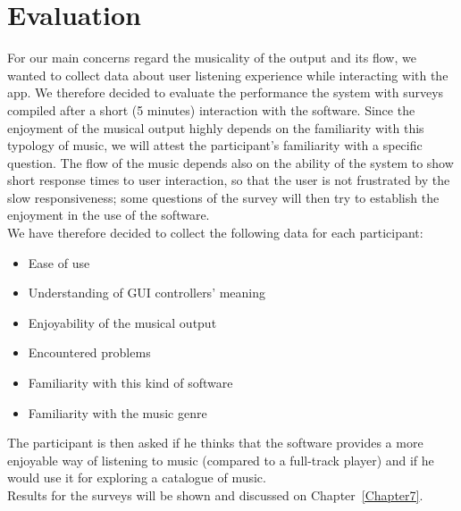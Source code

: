 \begin{figure}
\centering
{}
\end{figure}

\section{Evaluation}
\label{sec:evaluation_idea}
For our main concerns regard the musicality of the output and its flow, we wanted to collect data about user listening experience while interacting with the app. We therefore decided to evaluate the performance the system with surveys compiled after a short (5 minutes) interaction with the software. Since the enjoyment of the musical output highly depends on the familiarity with this typology of music, we will attest the participant's familiarity with a specific question. The flow of the music depends also on the ability of the system to show short response times to user interaction, so that the user is not frustrated by the slow responsiveness; some questions of the survey will then try to establish the enjoyment in the use of the software.\\
We have therefore decided to collect the following data for each participant:
\begin{itemize}
\item Ease of use
\item Understanding of GUI controllers' meaning
\item Enjoyability of the musical output
\item Encountered problems
\item Familiarity with this kind of software
\item Familiarity with the music genre 
\end{itemize}

The participant is then asked if he thinks that the software provides a more enjoyable way of listening to music (compared to a full-track player) and if he would use it for exploring a catalogue of music. \\
Results for the surveys will be shown and discussed on Chapter~\ref{Chapter7}.
